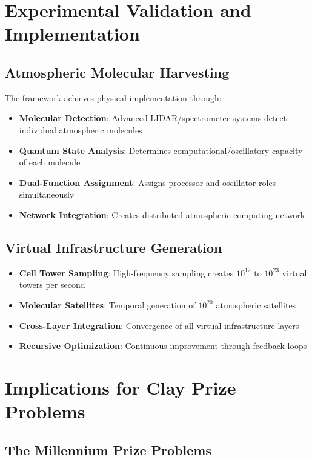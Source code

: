 \documentclass[12pt,a4paper]{article}
\begin{document}
\section{Experimental Validation and Implementation}

\subsection{Atmospheric Molecular Harvesting}

The framework achieves physical implementation through:

\begin{itemize}
\item \textbf{Molecular Detection}: Advanced LIDAR/spectrometer systems detect individual atmospheric molecules
\item \textbf{Quantum State Analysis}: Determines computational/oscillatory capacity of each molecule
\item \textbf{Dual-Function Assignment}: Assigns processor and oscillator roles simultaneously
\item \textbf{Network Integration}: Creates distributed atmospheric computing network
\end{itemize}

\subsection{Virtual Infrastructure Generation}

\begin{itemize}
\item \textbf{Cell Tower Sampling}: High-frequency sampling creates $10^{12}$ to $10^{23}$ virtual towers per second
\item \textbf{Molecular Satellites}: Temporal generation of $10^{20}$ atmospheric satellites
\item \textbf{Cross-Layer Integration}: Convergence of all virtual infrastructure layers
\item \textbf{Recursive Optimization}: Continuous improvement through feedback loops
\end{itemize}

\section{Implications for Clay Prize Problems}

\subsection{The Millennium Prize Problems}
\end{document}
